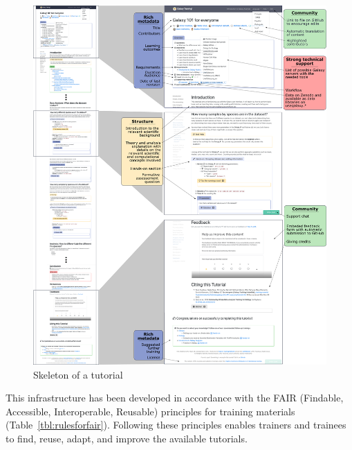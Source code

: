 \documentclass[10pt,letterpaper]{article}
\begin{document}
\begin{figure}[!ht]
	\centering
	\includegraphics[width=\textwidth]{images/tutorial_skeleton.png}
	\caption{Skeleton of a tutorial\label{fig:tutorial-skeleton}}
\end{figure}

This infrastructure has been developed in accordance with the FAIR (Findable, Accessible, Interoperable, Reusable) principles for training materials \cite{Garcia2020} (Table~\ref{tbl:rulesforfair}). Following these principles enables trainers and trainees to find, reuse, adapt, and improve the available tutorials. 
\end{document}
